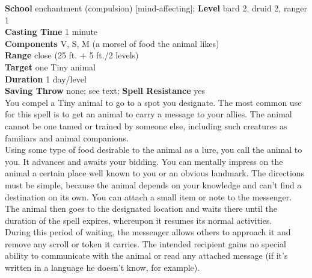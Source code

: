 \textbf{School} enchantment (compulsion) [mind-affecting]; \textbf{Level} bard 2, druid 2, ranger 1\\
\textbf{Casting Time} 1 minute\\
\textbf{Components} V, S, M (a morsel of food the animal likes)\\
\textbf{Range} close (25 ft. + 5 ft./2 levels)\\
\textbf{Target} one Tiny animal\\
\textbf{Duration} 1 day/level\\
\textbf{Saving Throw} none; see text; \textbf{Spell Resistance} yes\\
You compel a Tiny animal to go to a spot you designate. The most common use for this spell is to get an animal to carry a message to your allies. The animal cannot be one tamed or trained by someone else, including such creatures as familiars and animal companions.\\
Using some type of food desirable to the animal as a lure, you call the animal to you. It advances and awaits your bidding. You can mentally impress on the animal a certain place well known to you or an obvious landmark. The directions must be simple, because the animal depends on your knowledge and can't find a destination on its own. You can attach a small item or note to the messenger. The animal then goes to the designated location and waits there until the duration of the spell expires, whereupon it resumes its normal activities.\\
During this period of waiting, the messenger allows others to approach it and remove any scroll or token it carries. The intended recipient gains no special ability to communicate with the animal or read any attached message (if it's written in a language he doesn't know, for example).\\

